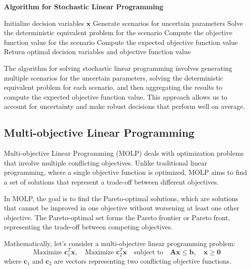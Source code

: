 \documentclass[12pt]{book} %
\begin{document}
\textbf{Algorithm for Stochastic Linear Programming}
\FloatBarrier
\begin{algorithm}
\caption{Stochastic Linear Programming}
\begin{algorithmic}[1]
\State Initialize decision variables $\mathbf{x}$
\State Generate scenarios for uncertain parameters
    \State Solve the deterministic equivalent problem for the scenario
    \State Compute the objective function value for the scenario
\EndFor
\State Compute the expected objective function value
\State Return optimal decision variables and objective function value
\end{algorithmic}
\end{algorithm}
\FloatBarrier
The algorithm for solving stochastic linear programming involves generating multiple scenarios for the uncertain parameters, solving the deterministic equivalent problem for each scenario, and then aggregating the results to compute the expected objective function value. This approach allows us to account for uncertainty and make robust decisions that perform well on average.

\subsection{Multi-objective Linear Programming}

Multi-objective Linear Programming (MOLP) deals with optimization problems that involve multiple conflicting objectives. Unlike traditional linear programming, where a single objective function is optimized, MOLP aims to find a set of solutions that represent a trade-off between different objectives.

In MOLP, the goal is to find the Pareto-optimal solutions, which are solutions that cannot be improved in one objective without worsening at least one other objective. The Pareto-optimal set forms the Pareto frontier or Pareto front, representing the trade-off between competing objectives.

Mathematically, let's consider a multi-objective linear programming problem:
\[
\text{Maximize } \mathbf{c}_1^T \mathbf{x}, \quad \text{Maximize } \mathbf{c}_2^T \mathbf{x} \quad \text{subject to} \quad \mathbf{Ax} \leq \mathbf{b}, \quad \mathbf{x} \geq \mathbf{0}
\]
where $\mathbf{c}_1$ and $\mathbf{c}_2$ are vectors representing two conflicting objective functions.
\end{document}
